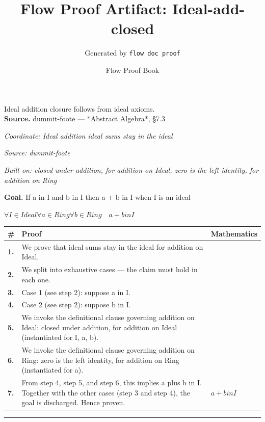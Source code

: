 \documentclass[11pt]{article}
\title{Flow Proof Artifact: Ideal-add-closed}
\author{Generated by \texttt{flow doc proof}}
\date{Flow Proof Book}
\theoremstyle{definition}
\begin{document}
\maketitle
Ideal addition closure follows from ideal axioms.\\[0.5em]
\textbf{Source.} dummit-foote — *Abstract Algebra*, §7.3\\[0.5em]
\bigskip
{}\par
\smallskip\noindent\textit{Coordinate: Ideal \cdot addition \cdot ideal sums stay in the ideal}\par
\smallskip\noindent\textit{Source: dummit-foote}\par
\smallskip\noindent\textit{Built on: closed under addition, for addition on Ideal, zero is the left identity, for addition on Ring}\par
\medskip
\noindent\textbf{Goal.} If a in I and b in I then a + b in I when I is an ideal\par
\noindent$\displaystyle \forall I \in Ideal \forall a \in Ring \forall b \in Ring\quad a + b in I$\par
\medskip
\noindent
\begin{tabular}{@{} >{\raggedright\arraybackslash}p{} >{\raggedright\arraybackslash}p{} >{\raggedleft\arraybackslash}p{} @{}}
\textbf{\#} & \textbf{Proof} & \textbf{Mathematics} \\
\midrule
\textbf{1.} & We prove that ideal sums stay in the ideal for addition on Ideal. & \\[0.45em]
\textbf{2.} & We split into exhaustive cases — the claim must hold in each one. & \\[0.45em]
\textbf{3.} & Case 1 (see step 2): suppose a in I. & \\[0.45em]
\textbf{4.} & Case 2 (see step 2): suppose b in I. & \\[0.45em]
\textbf{5.} & We invoke the definitional clause governing addition on Ideal: closed under addition, for addition on Ideal (instantiated for I, a, b). & \\[0.45em]
\textbf{6.} & We invoke the definitional clause governing addition on Ring: zero is the left identity, for addition on Ring (instantiated for a). & \\[0.45em]
\textbf{7.} & From step 4, step 5, and step 6, this implies a plus b in I. Together with the other cases (step 3 and step 4), the goal is discharged. Hence proven. & $\displaystyle a + b in I$ \\[0.45em]
\bottomrule
\end{tabular}
\label{thm:Ideal-addition-ideal_sums_stay_in_the_ideal}
\par\medskip\hrule
\end{document}
